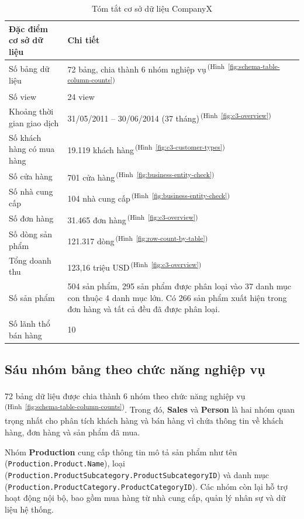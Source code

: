 \documentclass[a4paper,12pt]{article}
\numberwithin{figure}{section}
\numberwithin{table}{section}
\newcommand{\nguon}[1]{\textsuperscript{\,(Hình~\ref{#1})}}
\begin{document}
\begin{table}[H]
\centering
\caption{Tóm tắt cơ sở dữ liệu CompanyX}
\label{tab:c1-summary}
\small
\begin{tabularx}{\textwidth}{>{\raggedright\arraybackslash}p{5.6cm} X}
\toprule
\rowcolor{tblhead} \textbf{Đặc điểm cơ sở dữ liệu} & \textbf{Chi tiết} \\
\midrule
Số bảng dữ liệu & 72 bảng, chia thành 6 nhóm nghiệp vụ\nguon{fig:schema-table-column-counts} \\
Số view & 24 view \\
Khoảng thời gian giao dịch & 31/05/2011 -- 30/06/2014 (37 tháng)\nguon{fig:c3-overview} \\
Số khách hàng có mua hàng & 19.119 khách hàng\nguon{fig:c3-customer-types} \\
Số cửa hàng & 701 cửa hàng\nguon{fig:business-entity-check} \\
Số nhà cung cấp & 104 nhà cung cấp\nguon{fig:business-entity-check} \\
Số đơn hàng & 31.465 đơn hàng\nguon{fig:c3-overview} \\
Số dòng sản phẩm & 121.317 dòng\nguon{fig:row-count-by-table} \\
Tổng doanh thu & 123,16 triệu USD\nguon{fig:c3-overview} \\
Số sản phẩm & 504 sản phẩm, 295 sản phẩm được phân loại vào 37 danh mục con thuộc 4 danh mục lớn. Có 266 sản phẩm xuất hiện trong đơn hàng và tất cả đều đã được phân loại. \\
Số lãnh thổ bán hàng & 10 \\
\bottomrule
\end{tabularx}
\end{table}

\subsection{Sáu nhóm bảng theo chức năng nghiệp vụ}
\label{sec:c1-schemas}
72 bảng dữ liệu được chia thành 6 nhóm theo chức năng nghiệp vụ\nguon{fig:schema-table-column-counts}. Trong đó, \textbf{Sales} và \textbf{Person} là hai nhóm quan trọng nhất cho phân tích khách hàng và bán hàng vì chứa thông tin về khách hàng, đơn hàng và sản phẩm đã mua.

Nhóm \textbf{Production} cung cấp thông tin mô tả sản phẩm như tên (\texttt{Production.\allowbreak Product.\allowbreak Name}), loại (\texttt{Production.\allowbreak Product\allowbreak Subcategory.\allowbreak Product\allowbreak SubcategoryID}) và danh mục (\texttt{Production.\allowbreak Product\allowbreak Category.\allowbreak Product\allowbreak CategoryID}). Các nhóm còn lại hỗ trợ hoạt động nội bộ, bao gồm mua hàng từ nhà cung cấp, quản lý nhân sự và dữ liệu hệ thống.
\end{document}
